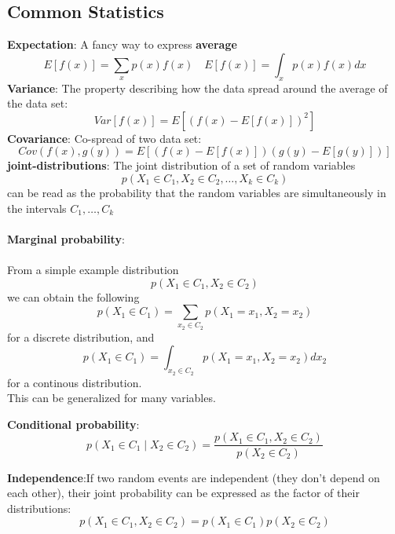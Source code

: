 \documentclass[11pt]{article}
\begin{document}
\begin{flushleft}
\section{Common Statistics}
\textbf{Expectation}: A fancy way to express \textbf{average}
$$E[f(x)] = \sum_x p(x) f(x) \quad E[f(x)] = \int_x p(x) f(x) dx $$
\textbf{Variance}: The property describing how the data spread around the average of the data set:
$$Var[f(x)] = E[ (f(x) - E[f(x)])^2 ]$$
\textbf{Covariance}: Co-spread of two data set:
$$Cov(f(x), g(y)) = E[(f(x) - E[f(x)])(g(y) - E[g(y)])]$$
\textbf{joint-distributions}: The joint distribution of a set of random variables
$$p(X_1 \in C_1, X_2 \in C_2, \dots, X_k \in C_k)$$
can be read as the probability that the random variables are simultaneously in the intervals $C_1, \dots, C_k$\\
\quad \\
\textbf{Marginal probability}: \\ \quad \\
From a simple example distribution 
$$p(X_1 \in C_1, X_2 \in C_2)$$
we can obtain the following 
$$p(X_1 \in C_1) = \sum_{x_2 \in C_2} p(X_1 = x_1, X_2 = x_2)$$
for a discrete distribution, and
$$p(X_1 \in C_1) = \int_{x_2 \in C_2} p(X_1 = x_1, X_2 = x_2) dx_2$$
for a continous distribution.\\
This can be generalized for many variables.

\textbf{Conditional probability}:
$$p(X_1 \in C_1 \mid X_2 \in C_2) = \frac{p(X_1 \in C_1 , X_2 \in C_2)}{p(X_2 \in C_2)} $$

\textbf{Independence}:If two random events are independent (they don't depend on each other), their joint probability can be expressed as the factor of their distributions:
$$p(X_1 \in C_1,  X_2 \in C_2) = p(X_1 \in C_1) p(X_2 \in C_2)$$

\end{flushleft}



\end{document}
